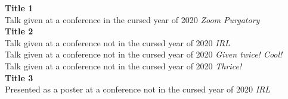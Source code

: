 %

\noindent\textbf{Title 1} \\
Talk given at a conference in the cursed year of 2020 \hfill \textit{Zoom Purgatory} \\

\noindent\textbf{Title 2} \\
Talk given at a conference not in the cursed year of 2020 \hfill \textit{IRL} \\
Talk given at a conference not in the cursed year of 2020 \hfill \textit{Given twice! Cool!} \\
Talk given at a conference not in the cursed year of 2020 \hfill \textit{Thrice!} \\


\noindent\textbf{Title 3} \\
Presented as a poster at a conference not in the cursed year of 2020 \hfill \textit{IRL} \\